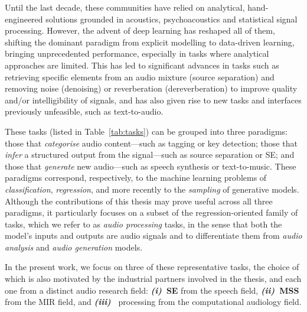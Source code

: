 Until the last decade, these communities have relied on analytical, hand-engineered solutions grounded in acoustics, psychoacoustics and
statistical signal processing. However, the advent of deep learning \citep{lecun2015deep} has reshaped all of them, shifting the dominant paradigm from
explicit modelling to data-driven learning, bringing unprecedented performance, especially in tasks where analytical approaches are limited. This has led to significant advances in tasks such as retrieving specific elements from an audio mixture (source separation) and removing noise (denoising) or reverberation (dereverberation) to improve quality and/or intelligibility of signals, and has also given rise to new tasks and interfaces previously unfeasible, such as text-to-audio. 

These tasks (listed in Table~\ref{tab:tasks}) can be grouped into three paradigms: those that \emph{categorise} audio content---such as tagging or key detection; those that \emph{infer} a structured output from the signal---such as source separation or \acrshort{SE}; and those that \emph{generate} new audio---such as speech synthesis or text-to-music. These paradigms correspond, respectively, to the machine learning problems of \emph{classification}, \emph{regression}, and more recently to the \emph{sampling} of generative models. Although the contributions of this thesis may prove useful across all three paradigms, it particularly focuses on a subset of the regression-oriented family of tasks, which we refer to as \emph{audio processing} tasks, in the sense that both the model's inputs and outputs are audio signals and to differentiate them from \emph{audio analysis} and \emph{audio generation} models. 

In the present work, we focus on three of these representative tasks, the choice of which is also motivated by the industrial partners involved in the thesis, and each one from a distinct audio research field: \textbf{\textit{(i)}~\acrfull{SE}} from the speech field, \textbf{\textit{(ii)}~\acrfull{MSS}} from the \acrfull{MIR} field, and \textbf{\textit{(iii)}~} processing from the computational audiology field. 

